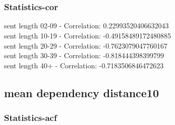 \documentclass{article}%
\begin{document}
\begin{figure}[ht]%
\centering%
\setlength{\abovecaptionskip}{-35pt}%
%
%
\\%
%
%
\\%
%
\end{figure}

%
\newpage%
\subsubsection{Statistics{-}cor}%
\label{ssubsec:Statistics{-}cor}%
\noindent%
sent length 02-09 - Correlation: 0.22993520406632043\\%
sent length 10-19 - Correlation: -0.49158489172480885\\%
sent length 20-29 - Correlation: -0.7623079047760167\\%
sent length 30-39 - Correlation: -0.818444398399799\\%
sent length 40+ - Correlation: -0.7183506846472623\\

%
\newpage

%
\subsection{mean dependency distance10}%
\label{subsec:meandependencydistance10}%
\subsubsection{Statistics{-}acf}%
\label{ssubsec:Statistics{-}acf}%
\end{document}

